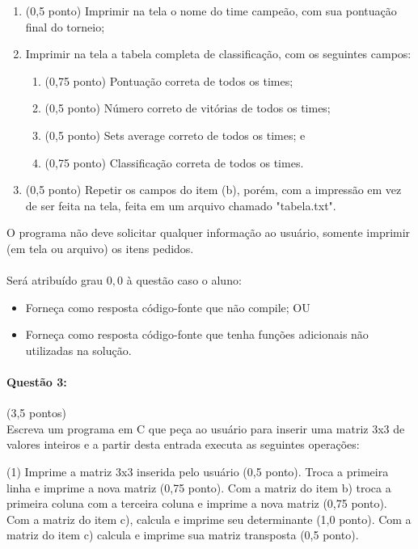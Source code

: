\documentclass[12pt,a4paper]{article}
\begin{document}
\begin{enumerate}[label=(\alph*)]
\item (0,5 ponto) Imprimir na tela o nome do time campeão, com sua pontuação final do torneio;
\item Imprimir na tela a tabela completa de classificação, com os seguintes campos:
\begin{enumerate}[label=(b.\arabic*)]
\item (0,75 ponto) Pontuação correta de todos os times;
\item (0,5 ponto) Número correto de vitórias de todos os times;
\item (0,5 ponto) Sets average correto de todos os times; e
\item (0,75 ponto) Classificação correta de todos os times.
\end{enumerate}
\item (0,5 ponto) Repetir os campos do item (b), porém, com a impressão em vez de ser feita na tela, feita em um arquivo chamado "tabela.txt".
\end{enumerate}

O programa não deve solicitar qualquer informação ao usuário, somente imprimir (em tela ou arquivo) os itens pedidos.\\
\\
Será atribuído grau $0,0$ à questão caso o aluno:
\begin{itemize}
\item Forneça como resposta código-fonte que não compile; OU
\item Forneça como resposta código-fonte que tenha funções adicionais não utilizadas na solução.
\end{itemize}

\paragraph{Questão 3:}(3,5 pontos)\\
Escreva um programa em C que peça ao usuário para inserir uma matriz 3x3 de valores inteiros e a partir desta entrada executa as seguintes operações:

\begin{tasks}(1)
\task Imprime a matriz 3x3 inserida pelo usuário (0,5 ponto).
\task Troca a primeira linha e imprime a nova matriz (0,75 ponto).
\task Com a matriz do item b) troca a primeira coluna com a terceira coluna e imprime a nova matriz (0,75 ponto).
\task Com a matriz do item c), calcula e imprime seu determinante (1,0 ponto).
\task Com a matriz do item c) calcula e imprime sua matriz transposta (0,5 ponto).
\end{tasks}
\end{document}
